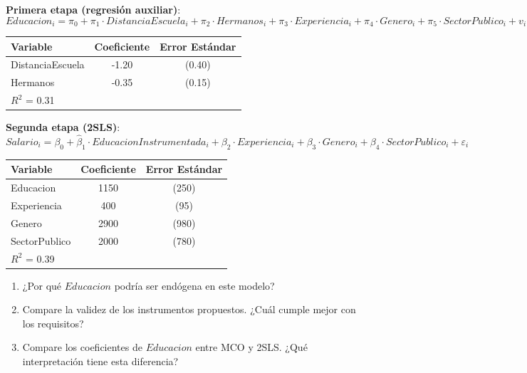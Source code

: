 \documentclass[12pt]{article}
\begin{document}
\textbf{Primera etapa (regresión auxiliar)}:
\begin{equation*}
Educacion_i = \pi_0 + \pi_1 \cdot DistanciaEscuela_i + \pi_2 \cdot Hermanos_i + \pi_3 \cdot Experiencia_i + \pi_4 \cdot Genero_i + \pi_5 \cdot SectorPublico_i + v_i
\end{equation*}

\begin{center}
\begin{tabular}{lcc}
\toprule
Variable & Coeficiente & Error Estándar \\
\midrule
DistanciaEscuela & -1.20 & (0.40) \\
Hermanos         & -0.35 & (0.15) \\
\midrule
$R^2$ = 0.31 & & \\
\bottomrule
\end{tabular}
\end{center}

\textbf{Segunda etapa (2SLS)}:
\begin{equation*}
Salario_i = \beta_0 + \hat{\beta}_1 \cdot EducacionInstrumentada_i + \beta_2 \cdot Experiencia_i + \beta_3 \cdot Genero_i + \beta_4 \cdot SectorPublico_i + \varepsilon_i
\end{equation*}

\begin{center}
\begin{tabular}{lcc}
\toprule
Variable & Coeficiente & Error Estándar \\
\midrule
Educacion        & 1150  & (250) \\
Experiencia      & 400   & (95)  \\
Genero           & 2900  & (980) \\
SectorPublico    & 2000  & (780) \\
\midrule
$R^2$ = 0.39 & & \\
\bottomrule
\end{tabular}
\end{center}

\begin{enumerate}
  \item[a)] ¿Por qué $Educacion$ podría ser endógena en este modelo?
  \item[b)] Compare la validez de los instrumentos propuestos. ¿Cuál cumple mejor con los requisitos?
  \item[c)] Compare los coeficientes de $Educacion$ entre MCO y 2SLS. ¿Qué interpretación tiene esta diferencia?
\end{enumerate}
\end{document}
